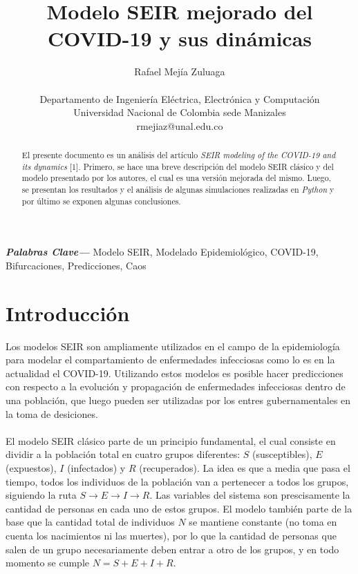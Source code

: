 \documentclass[conference]{IEEEtran}
\providecommand{\keywords}[1]
{
  \small	
  \textbf{\textit{Palabras Clave---}} #1
}
\begin{document}
    

\title{Modelo SEIR mejorado del COVID-19 y sus dinámicas}

\author{Rafael Mejía Zuluaga \\\\Departamento de Ingeniería Eléctrica, Electrónica y Computación \\ Universidad Nacional de Colombia sede Manizales \\ rmejiaz@unal.edu.co}

\maketitle


\begin{abstract}
    El presente documento es un análisis del artículo \textit{SEIR modeling of the
    COVID-19 and its dynamics} [1]. Primero, se hace una breve descripción del modelo SEIR 
    clásico y del modelo presentado por los autores, el cual es una versión mejorada del mismo.
    Luego, se presentan los resultados y el análisis de algunas simulaciones realizadas en 
    \textit{Python} y por último se exponen algunas conclusiones.  
    \newline
\end{abstract}

\keywords{Modelo SEIR, Modelado Epidemiológico, COVID-19, Bifurcaciones, Predicciones, Caos}

\section{Introducción}
Los modelos SEIR son ampliamente utilizados en el campo de la epidemiología para 
modelar el compartamiento de enfermedades infecciosas como lo es en la actualidad 
el COVID-19. Utilizando estos modelos es posible hacer predicciones con respecto 
a la evolución y propagación de enfermedades infecciosas dentro de una población, que 
luego pueden ser utilizadas por los entres gubernamentales en la toma de desiciones.
\\\\
El modelo SEIR clásico parte de un principio fundamental, el cual consiste en dividir a
la población total en cuatro grupos diferentes: $S$ (susceptibles), $E$ (expuestos),
$I$ (infectados) y $R$ (recuperados). La idea es que a media que pasa el tiempo, 
todos los individuos de la población van a pertenecer a todos los grupos, siguiendo la 
ruta $S \rightarrow E \rightarrow I \rightarrow R$. Las variables del sistema son
prescisamente la cantidad de personas en cada uno de estos grupos. El modelo también 
parte de la base que la cantidad total de individuos $N$ se mantiene constante (no toma en
cuenta los nacimientos ni las muertes), por lo que la cantidad de personas que salen de
un grupo necesariamente deben entrar a otro de los grupos, y en todo momento se cumple
$N = S + E + I + R$.
\end{document}
